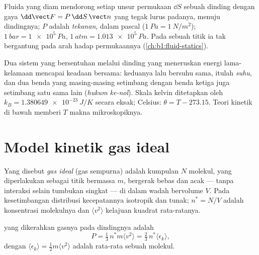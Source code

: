 \begin{definition}[Tekanan]\label{def:b1:kinetic-theory:pressure}
Fluida yang diam mendorong setiap unsur permukaan $\dd S$ sebuah dinding dengan
gaya $\dd\vect F = P\,\dd S\,\vect n$ yang tegak lurus padanya, menuju dindingnya; $P$ adalah
\emph{tekanan}, dalam pascal ($\qty{1}{Pa} = \qty{1}{N/m^2}$); $\qty{1}{bar}
= \qty{1e5}{Pa}$, $\qty{1}{atm} = \qty{1.013e5}{Pa}$. Pada sebuah titik ia tak
bergantung pada arah hadap permukaannya (\cref{ch:b1:fluid-statics}).
\end{definition}

\begin{definition}[Suhu]\label{def:b1:kinetic-theory:temperature}
Dua sistem yang bersentuhan melalui dinding yang meneruskan energi lama-kelamaan
mencapai keadaan bersama: keduanya lalu bersuhu sama, itulah \emph{suhu}, dan
dua benda yang masing-masing setimbang dengan benda ketiga juga setimbang satu sama
lain (\emph{hukum ke-nol}). Skala kelvin ditetapkan oleh
$k_B = \qty{1.380649e-23}{J/K}$ secara eksak; Celsius: $\theta = T - 273.15$. Teori
kinetik di bawah memberi $T$ makna mikroskopiknya.
\end{definition}

\section{Model kinetik gas ideal}

\begin{definition}\label{def:b1:kinetic-theory:model}
Yang disebut \emph{gas ideal} (gas sempurna) adalah kumpulan $N$ molekul,
yang diperlakukan sebagai titik bermassa $m$, bergerak bebas dan acak --- tanpa
interaksi selain tumbukan singkat --- di dalam wadah bervolume $V$.
Pada kesetimbangan distribusi kecepatannya isotropik dan tunak;
$n^* = N/V$ adalah konsentrasi molekulnya dan $\langle v^2\rangle$ kelajuan kuadrat
rata-ratanya.
\end{definition}

\begin{theorem}\label{thm:b1:kinetic-theory:pressure}
 yang dikerahkan gasnya pada dindingnya adalah
\[
P = \tfrac13\,n^*m\langle v^2\rangle = \tfrac23\,n^*\langle\epsilon_k\rangle ,
\]
dengan $\langle\epsilon_k\rangle = \tfrac12 m\langle v^2\rangle$ adalah  rata-rata sebuah molekul.
\end{theorem}

